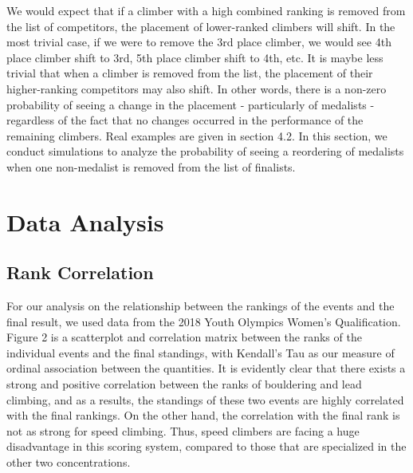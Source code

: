 \documentclass[12pt]{article}
\begin{document}
We would expect that if a climber with a high combined ranking is
removed from the list of competitors, the placement of lower-ranked
climbers will shift. In the most trivial case, if we were to remove the
3rd place climber, we would see 4th place climber shift to 3rd, 5th
place climber shift to 4th, etc. It is maybe less trivial that when a
climber is removed from the list, the placement of their higher-ranking
competitors may also shift. In other words, there is a non-zero
probability of seeing a change in the placement - particularly of
medalists - regardless of the fact that no changes occurred in the
performance of the remaining climbers. Real examples are given in
section 4.2. In this section, we conduct simulations to analyze the
probability of seeing a reordering of medalists when one non-medalist is
removed from the list of finalists.

\hypertarget{data-analysis}{%
\section{Data Analysis}\label{data-analysis}}

\hypertarget{rank-correlation}{%
\subsection{Rank Correlation}\label{rank-correlation}}

For our analysis on the relationship between the rankings of the events
and the final result, we used data from the 2018 Youth Olympics Women's
Qualification. Figure 2 is a scatterplot and correlation matrix between
the ranks of the individual events and the final standings, with
Kendall's Tau \citep{kendall1938} as our measure of ordinal association
between the quantities. It is evidently clear that there exists a strong
and positive correlation between the ranks of bouldering and lead
climbing, and as a results, the standings of these two events are highly
correlated with the final rankings. On the other hand, the correlation
with the final rank is not as strong for speed climbing. Thus, speed
climbers are facing a huge disadvantage in this scoring system, compared
to those that are specialized in the other two concentrations.
\end{document}
